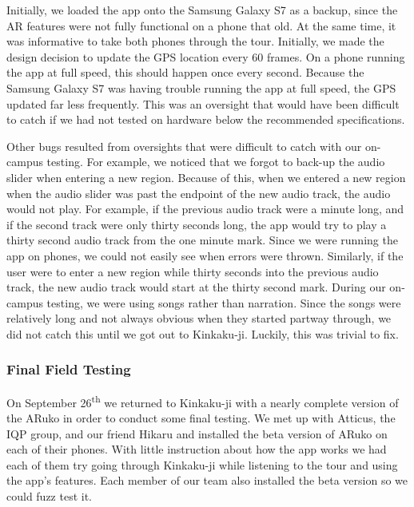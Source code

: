 \documentclass[a4paper, 10pt, american, titlepage]{article}
\begin{document}
Initially, we loaded the app onto the Samsung Galaxy S7 as a backup, since the
AR features were not fully functional on a phone that old. At the same time, it
was informative to take both phones through the tour. Initially, we made the
design decision to update the GPS location every 60 frames. On a phone running
the app at full speed, this should happen once every second. Because the
Samsung Galaxy S7 was having trouble running the app at full speed, the GPS
updated far less frequently. This was an oversight that would have been
difficult to catch if we had not tested on hardware below the recommended
specifications.

Other bugs resulted from oversights that were difficult to catch with our
on-campus testing.  For example, we noticed that we forgot to back-up the audio
slider when entering a new region.  Because of this, when we entered a new
region when the audio slider was past the endpoint of the new audio track, the
audio would not play. For example, if the previous audio track were a minute
long, and if the second track were only thirty seconds long, the app would try
to play a thirty second audio track from the one minute mark. Since we were
running the app on phones, we could not easily see when errors were thrown.
Similarly, if the user were to enter a new region while thirty seconds into the
previous audio track, the new audio track would start at the thirty second
mark. During our on-campus testing, we were using songs rather than narration.
Since the songs were relatively long and not always obvious when they started
partway through, we did not catch this until we got out to Kinkaku-ji. Luckily,
this was trivial to fix.

\subsubsection{Final Field Testing}
\label{sec:finalFieldTesting}

On September 26\textsuperscript{th} we returned to Kinkaku-ji with a nearly
complete version of the ARuko in order to conduct some final testing. We met
up with Atticus, the IQP group, and our friend Hikaru and installed the beta
version of ARuko on each of their phones. With little instruction about how
the app works we had each of them try going through Kinkaku-ji while
listening to the tour and using the app's features. Each member of our team
also installed the beta version so we could fuzz test it.
\end{document}
